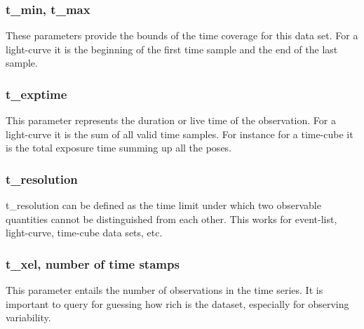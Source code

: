 \documentclass[11pt,a4paper]{ivoa}
\begin{document}
 \subsubsection{t\_min, t\_max}
 These parameters provide the bounds of the time coverage for this data set. For a light-curve it is the beginning of the first time sample and the end of the last sample.
  \subsubsection{t\_exptime}
  This parameter represents the duration or live time of the observation.
  For a light-curve it is the sum of all valid time samples. For instance for a time-cube it is the total exposure time summing up all the poses.
  \subsubsection{t\_resolution}
  t\_resolution can be defined as the time limit under which two observable quantities cannot be distinguished from each other.
  This works for event-list, light-curve, time-cube data sets, etc.
  \subsubsection{t\_xel, number of time stamps}
This parameter entails the number of observations in the time series. It is important to query for guessing how rich is the dataset, especially for observing variability.


\end{document}
